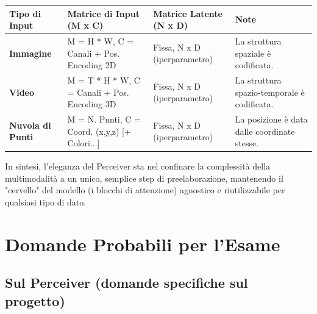 \documentclass[
  11pt,
]{article}
\newcounter{none} %
\begin{document}
{\def\LTcaptype{none} %
\begin{longtable}{@{}
  >{\raggedright\arraybackslash}p{}
  >{\raggedright\arraybackslash}p{}
  >{\raggedright\arraybackslash}p{}
  >{\raggedright\arraybackslash}p{}@{}}
\toprule\noalign{}
\begin{minipage}[b]{\linewidth}\raggedright
Tipo di Input
\end{minipage} & \begin{minipage}[b]{\linewidth}\raggedright
Matrice di Input (M x C)
\end{minipage} & \begin{minipage}[b]{\linewidth}\raggedright
Matrice Latente (N x D)
\end{minipage} & \begin{minipage}[b]{\linewidth}\raggedright
Note
\end{minipage} \\
\midrule\noalign{}
\endhead
\bottomrule\noalign{}
\endlastfoot
\textbf{Immagine} & M = H * W, C = Canali + Pos. Encoding 2D & Fissa, N
x D (iperparametro) & La struttura spaziale è codificata. \\
\textbf{Video} & M = T * H * W, C = Canali + Pos. Encoding 3D & Fissa, N
x D (iperparametro) & La struttura spazio-temporale è codificata. \\
\textbf{Nuvola di Punti} & M = N. Punti, C = Coord. (x,y,z) {[}+
Colori...{]} & Fissa, N x D (iperparametro) & La posizione è data dalle
coordinate stesse. \\
\end{longtable}
}

In sintesi, l'eleganza del Perceiver sta nel confinare
la complessità della multimodalità a un unico, semplice step di
preelaborazione, mantenendo il "cervello" del modello (i blocchi di
attenzione) agnostico e riutilizzabile per qualsiasi tipo di dato.


\section{Domande Probabili per l'Esame}

\subsection{Sul Perceiver (domande specifiche sul progetto)}
\end{document}
